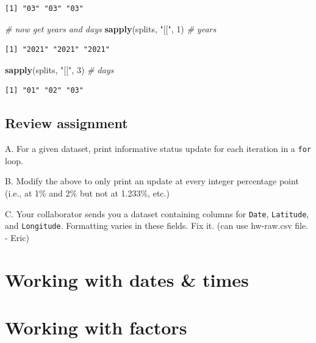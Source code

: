 \documentclass[
]{book}
\newenvironment{Shaded}{\begin{snugshade}}{\end{snugshade}}
\newcommand{\CommentTok}[1]{\textcolor[rgb]{0.56,0.35,0.01}{\textit{#1}}}
\newcommand{\DecValTok}[1]{\textcolor[rgb]{0.00,0.00,0.81}{#1}}
\newcommand{\KeywordTok}[1]{\textcolor[rgb]{0.13,0.29,0.53}{\textbf{#1}}}
\newcommand{\NormalTok}[1]{#1}
\newcommand{\StringTok}[1]{\textcolor[rgb]{0.31,0.60,0.02}{#1}}
\begin{document}
\begin{verbatim}
[1] "03" "03" "03"
\end{verbatim}

\begin{Shaded}
\begin{Highlighting}[]
\CommentTok{# now get years and days}
\KeywordTok{sapply}\NormalTok{(splits, }\StringTok{"[["}\NormalTok{, }\DecValTok{1}\NormalTok{) }\CommentTok{# years}
\end{Highlighting}
\end{Shaded}

\begin{verbatim}
[1] "2021" "2021" "2021"
\end{verbatim}

\begin{Shaded}
\begin{Highlighting}[]
\KeywordTok{sapply}\NormalTok{(splits, }\StringTok{"[["}\NormalTok{, }\DecValTok{3}\NormalTok{) }\CommentTok{# days}
\end{Highlighting}
\end{Shaded}

\begin{verbatim}
[1] "01" "02" "03"
\end{verbatim}

\hypertarget{review-assignment-10}{%
\section*{Review assignment}\label{review-assignment-10}}

A. For a given dataset, print informative status update for each iteration in a \texttt{for} loop.

B. Modify the above to only print an update at every integer percentage point (i.e., at 1\% and 2\% but not at 1.233\%, etc.)

C. Your collaborator sends you a dataset containing columns for \texttt{Date}, \texttt{Latitude}, and \texttt{Longitude}. Formatting varies in these fields. Fix it. (can use hw-raw.csv file. - Eric)

\hypertarget{working-with-dates-times}{%
\chapter{Working with dates \& times}\label{working-with-dates-times}}

\hypertarget{working-with-factors}{%
\chapter{Working with factors}\label{working-with-factors}}
\end{document}
